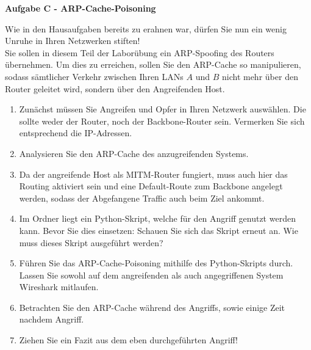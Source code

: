 \documentclass[paper=a4,fontsize=11pt]{scrartcl}%
\numberwithin{equation}{section}
\begin{document}
\begin{center}
\Large{\textbf{Aufgabe C - ARP-Cache-Poisoning}}
\end{center}\vskip0.25in
Wie in den Hausaufgaben bereits zu erahnen war, dürfen Sie nun ein wenig Unruhe in Ihren Netzwerken stiften!\\
Sie sollen in diesem Teil der Laborübung ein ARP-Spoofing des Routers übernehmen. Um dies zu erreichen, sollen Sie den ARP-Cache so manipulieren, sodass sämtlicher Verkehr zwischen Ihren LANs $A$ und $B$ nicht mehr über den Router geleitet wird, sondern über den Angreifenden Host.
\begin{enumerate}
	\item Zunächst müssen Sie Angreifen und Opfer in Ihren Netzwerk auswählen. Die sollte weder der Router, noch der Backbone-Router sein. Vermerken Sie sich entsprechend die IP-Adressen.
	\item Analysieren Sie den ARP-Cache des anzugreifenden Systems.
	\item Da der angreifende Host als MITM-Router fungiert, muss auch hier das Routing aktiviert sein und eine Default-Route zum Backbone angelegt werden, sodass der Abgefangene Traffic auch beim Ziel ankommt.
	\item Im Ordner  liegt ein Python-Skript, welche für den Angriff genutzt werden kann. Bevor Sie dies einsetzen: Schauen Sie sich das Skript erneut an. Wie muss dieses Skript ausgeführt werden?
	\item Führen Sie das ARP-Cache-Poisoning mithilfe des Python-Skripts durch. Lassen Sie sowohl auf dem angreifenden als auch angegriffenen System Wireshark mitlaufen.
	\item Betrachten Sie den ARP-Cache während des Angriffs, sowie einige Zeit nachdem Angriff.
	\item Ziehen Sie ein Fazit aus dem eben durchgeführten Angriff!
\end{enumerate}
\end{document}
